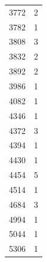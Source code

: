 \begin{table}[ht]
{\begin{tabular}{lr}
            3772                                              & 2                                                    \\
            3782                                              & 1                                                    \\
            3808                                              & 3                                                    \\
            3832                                              & 2                                                    \\
            3892                                              & 2                                                    \\
            3986                                              & 1                                                    \\
            4082                                              & 1                                                    \\
            4346                                              & 1                                                    \\
            4372                                              & 3                                                    \\
            4394                                              & 1                                                    \\
            4430                                              & 1                                                    \\
            4454                                              & 5                                                    \\
            4514                                              & 1                                                    \\
            4684                                              & 3                                                    \\
            4994                                              & 1                                                    \\
            5044                                              & 1                                                    \\
            5306                                              & 1                                                    \\

\end{tabular}}
\end{table}
